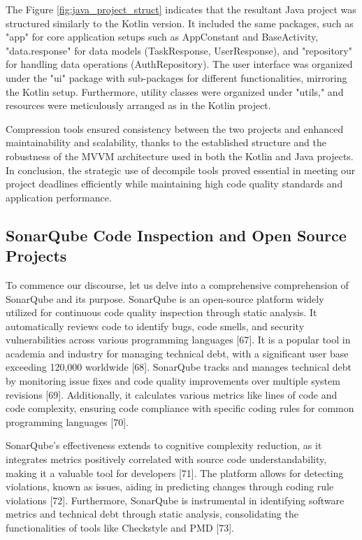 \par
The Figure \ref{fig:java_project_struct} indicates that the resultant Java project was structured similarly to the Kotlin version. It included the same packages, such as "app" for core application setups such as AppConstant and BaseActivity, "data.response" for data models (TaskResponse, UserResponse), and "repository" for handling data operations (AuthRepository). The user interface was organized under the "ui" package with sub-packages for different functionalities, mirroring the Kotlin setup. Furthermore, utility classes were organized under "utils," and resources were meticulously arranged as in the Kotlin project.
\par
Compression tools ensured consistency between the two projects and enhanced maintainability and scalability, thanks to the established structure and the robustness of the MVVM architecture used in both the Kotlin and Java projects. In conclusion, the strategic use of decompile tools proved essential in meeting our project deadlines efficiently while maintaining high code quality standards and application performance.
\subsection{SonarQube Code Inspection and Open Source Projects}
To commence our discourse, let us delve into a comprehensive comprehension of SonarQube and its purpose. SonarQube is an open-source platform widely utilized for continuous code quality inspection through static analysis. It automatically reviews code to identify bugs, code smells, and security vulnerabilities across various programming languages [67]. It is a popular tool in academia and industry for managing technical debt, with a significant user base exceeding 120,000 worldwide [68]. SonarQube tracks and manages technical debt by monitoring issue fixes and code quality improvements over multiple system revisions [69]. Additionally, it calculates various metrics like lines of code and code complexity, ensuring code compliance with specific coding rules for common programming languages [70].
\par
SonarQube's effectiveness extends to cognitive complexity reduction, as it integrates metrics positively correlated with source code understandability, making it a valuable tool for developers [71]. The platform allows for detecting violations, known as issues, aiding in predicting changes through coding rule violations [72]. Furthermore, SonarQube is instrumental in identifying software metrics and technical debt through static analysis, consolidating the functionalities of tools like Checkstyle and PMD [73].
